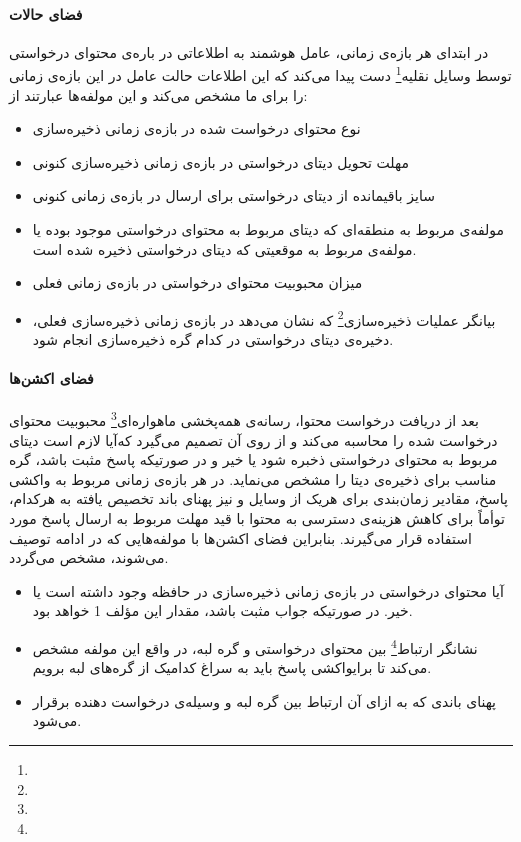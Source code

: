 \paragraph{فضای حالات}
در ابتدای هر بازه‌ی زمانی، عامل هوشمند به اطلاعاتی در باره‌ی محتوای درخواستی توسط وسایل نقلیه\footnote{} دست پیدا می‌کند که این اطلاعات حالت عامل در این بازه‌ی زمانی را برای ما مشخص می‌کند و این مولفه‌ها عبارتند از:  
\begin{itemize}
	\item 
	نوع محتوای درخواست شده در بازه‌ی زمانی ذخیره‌سازی 
	\item 
	مهلت تحویل دیتای درخواستی در بازه‌ی زمانی ذخیره‌سازی کنونی
	\item
	سایز باقیمانده از دیتای درخواستی برای ارسال در بازه‌ی زمانی کنونی
	\item
	مولفه‌ی مربوط به منطقه‌ای که دیتای مربوط به محتوای درخواستی موجود بوده یا مولفه‌ی مربوط به موقعیتی که دیتای درخواستی ذخیره شده است.
	\item 
	میزان محبوبیت محتوای درخواستی در بازه‌ی زمانی فعلی
	\item 
	بیانگر عملیات ذخیره‌سازی\footnote{} که نشان می‌دهد در بازه‌ی زمانی ذخیره‌سازی فعلی، دخیره‌ی دیتای درخواستی در کدام گره ذخیره‌سازی انجام شود.
\end{itemize}

\paragraph{فضای اکشن‌ها}
بعد از دریافت درخواست محتوا، رسانه‌ی همه‌پخشی ماهواره‌ای\footnote{} محبوبیت محتوای درخواست شده را محاسبه می‌کند و از روی آن تصمیم می‌گیرد که‌آیا لازم است دیتای مربوط به محتوای درخواستی ذخبره شود یا خیر و در صورتیکه پاسخ مثبت باشد،‌ گره مناسب برای ذخیره‌ی دیتا را مشخص می‌نماید. در هر بازه‌ی زمانی مربوط به واکشی پاسخ، مقادیر زمان‌بندی برای هریک از وسایل و نیز پهنای باند تخصیص یافته به هرکدام، توأماً برای کاهش هزینه‌ی دسترسی به محتوا با قید مهلت مربوط به ارسال پاسخ مورد استفاده قرار می‌گیرند. بنابراین فضای اکشن‌ها با مولفه‌هایی که در ادامه توصیف می‌شوند، مشخص می‌گردد.
\begin{itemize}
	\item 
	آیا محتوای درخواستی در بازه‌ی زمانی ذخیره‌سازی در حافظه وجود داشته است یا خیر. در صورتیکه جواب مثبت باشد، مقدار این مؤلف 1 خواهد بود.  
	\item 
	نشانگر ارتباط\footnote{} بین محتوای درخواستی و گره لبه، در واقع این مولفه مشخص می‌کند تا برایواکشی پاسخ باید به سراغ کدامیک از گره‌های لبه برویم.
	\item
	پهنای باندی که به ازای آن ارتباط بین گره لبه و وسیله‌ی درخواست دهنده برقرار می‌شود.
\end{itemize}
 
